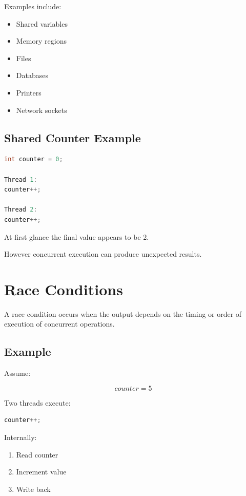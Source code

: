 Examples include:

\begin{itemize}
\item Shared variables
\item Memory regions
\item Files
\item Databases
\item Printers
\item Network sockets
\end{itemize}

\subsection{Shared Counter Example}

\begin{lstlisting}[language=C++,style=interviewcode]
int counter = 0;

Thread 1:
counter++;

Thread 2:
counter++;
\end{lstlisting}

At first glance the final value appears to be 2.

However concurrent execution can produce unexpected results.

\section{Race Conditions}

A race condition occurs when the output depends on the timing or order of execution of concurrent operations.

\subsection{Example}

Assume:

\[
counter = 5
\]

Two threads execute:

\begin{lstlisting}[language=C++,style=interviewcode]
counter++;
\end{lstlisting}

Internally:

\begin{enumerate}
\item Read counter
\item Increment value
\item Write back
\end{enumerate}

